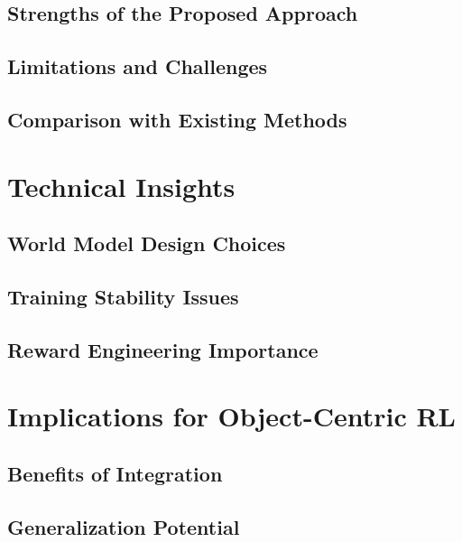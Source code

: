\documentclass[
	english,
	ruledheaders=section,
	class=report,
	thesis={type=master},
	accentcolor=9c,
	custommargins=true,
	marginpar=false,
	parskip=half-,
	fontsize=11pt,
]{tudapub}
\begin{document}
\subsection{Strengths of the Proposed Approach}
\label{subsec:strengths}

\subsection{Limitations and Challenges}
\label{subsec:limitations_challenges}

\subsection{Comparison with Existing Methods}
\label{subsec:comparison}

\section{Technical Insights}
\label{sec:technical_insights}

\subsection{World Model Design Choices}
\label{subsec:design_choices}

\subsection{Training Stability Issues}
\label{subsec:stability_issues}

\subsection{Reward Engineering Importance}
\label{subsec:reward_engineering}

\section{Implications for Object-Centric RL}
\label{sec:implications}

\subsection{Benefits of Integration}
\label{subsec:integration_benefits}

\subsection{Generalization Potential}
\label{subsec:generalization_potential}
\end{document}
